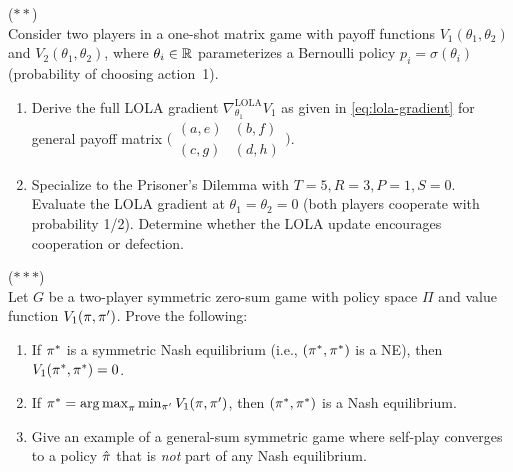 \documentclass[11pt,a4paper]{article}
\begin{document}
\begin{exercise}
\textnormal{(\(**\))} \\
Consider two players in a one-shot matrix game with payoff functions
$V_1(\theta_1, \theta_2)$ and $V_2(\theta_1, \theta_2)$, where
$\theta_i \in \mathbb{R}$ parameterizes a Bernoulli policy
$p_i = \sigma(\theta_i)$ (probability of choosing action~1).
\begin{enumerate}[label=(\alph*)]
  \item Derive the full LOLA gradient
    $\nabla_{\theta_1}^{\mathrm{LOLA}} V_1$ as given in
    \eqref{eq:lola-gradient} for general payoff matrix
    $\bigl(\begin{smallmatrix} (a,e) & (b,f) \\ (c,g) & (d,h)
    \end{smallmatrix}\bigr)$.
  \item Specialize to the Prisoner's Dilemma with $T=5, R=3, P=1, S=0$.
    Evaluate the LOLA gradient at $\theta_1 = \theta_2 = 0$ (both
    players cooperate with probability 1/2).  Determine whether the
    LOLA update encourages cooperation or defection.
\end{enumerate}
\end{exercise}

\begin{exercise}
\textnormal{(\(***\))} \\
Let $G$ be a two-player symmetric zero-sum game with policy space
$\Pi$ and value function $V_1(\pi, \pi')$.  Prove the following:
\begin{enumerate}[label=(\alph*)]
  \item If $\pi^*$ is a symmetric Nash equilibrium (i.e.,
    $(\pi^*, \pi^*)$ is a NE), then
    $V_1(\pi^*, \pi^*) = 0$.
  \item If $\pi^* = \operatorname{arg\,max}_\pi \min_{\pi'} V_1(\pi, \pi')$,
    then $(\pi^*, \pi^*)$ is a Nash equilibrium.
  \item Give an example of a general-sum symmetric game where self-play
    converges to a policy $\hat{\pi}$ that is \emph{not} part of
    any Nash equilibrium.
\end{enumerate}
\end{exercise}
\end{document}
